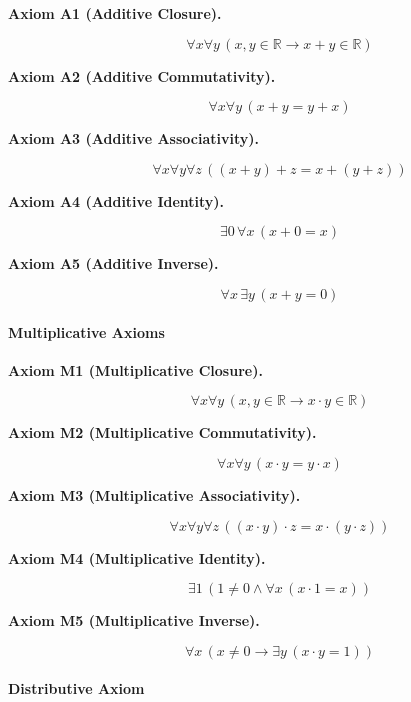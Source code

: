 \begin{description}

\item[\textbf{Axiom A1 (Additive Closure).}]
\[
\forall x \forall y \, (x,y \in \mathbb{R} \rightarrow x+y \in \mathbb{R})
\]

\item[\textbf{Axiom A2 (Additive Commutativity).}]
\[
\forall x \forall y \, (x+y = y+x)
\]

\item[\textbf{Axiom A3 (Additive Associativity).}]
\[
\forall x \forall y \forall z \, ((x+y)+z = x+(y+z))
\]

\item[\textbf{Axiom A4 (Additive Identity).}]
\[
\exists 0 \, \forall x \, (x+0 = x)
\]

\item[\textbf{Axiom A5 (Additive Inverse).}]
\[
\forall x \, \exists y \, (x+y = 0)
\]

\end{description}

\paragraph{Multiplicative Axioms}

\begin{description}

\item[\textbf{Axiom M1 (Multiplicative Closure).}]
\[
\forall x \forall y \, (x,y \in \mathbb{R} \rightarrow x\cdot y \in \mathbb{R})
\]

\item[\textbf{Axiom M2 (Multiplicative Commutativity).}]
\[
\forall x \forall y \, (x\cdot y = y\cdot x)
\]

\item[\textbf{Axiom M3 (Multiplicative Associativity).}]
\[
\forall x \forall y \forall z \, ((x\cdot y)\cdot z = x\cdot (y\cdot z))
\]

\item[\textbf{Axiom M4 (Multiplicative Identity).}]
\[
\exists 1 \, (1 \neq 0 \wedge \forall x \, (x\cdot 1 = x))
\]

\item[\textbf{Axiom M5 (Multiplicative Inverse).}]
\[
\forall x \, (x \neq 0 \rightarrow \exists y \, (x\cdot y = 1))
\]

\end{description}

\paragraph{Distributive Axiom}

